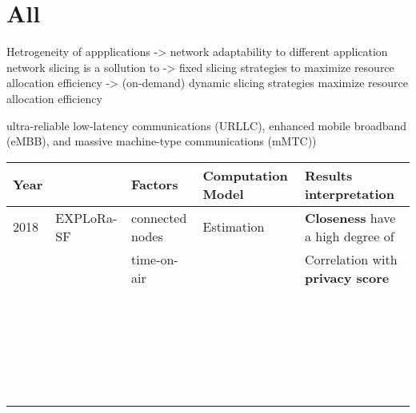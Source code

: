 \section{All}

\onecolumn
\setlength{\hoffset}{-.5in}

Hetrogeneity of appplications -> network adaptability to different application
network slicing is a sollution to 
-> fixed slicing strategies to maximize resource allocation efficiency
-> (on-demand) dynamic slicing strategies maximize resource allocation efficiency

ultra-reliable low-latency communications (URLLC), 
enhanced mobile broadband (eMBB),
and massive machine-type communications (mMTC))

\begin{longtable}{lllll}
	Year  & \                                              & \textbf{Factors}           & \textbf{Computation Model}             & \textbf{Results interpretation}                               \\\hline
	2018  & EXPLoRa-SF \cite{cuomo_explora_2017}           & connected nodes            & Estimation                             & \textbf{Closeness} have a high degree of                      \\
	\     &                                                & time-on-air                &                                        & Correlation with \textbf{privacy score}                       \\\hline
	\     &                                                &                               &                                        &                                                               \\
	\     &                                                &                               &                                        &                                                               \\
	\     &                                                &                               &                                        &                                                               \\
	\     &                                                &                               &                                        &                                                               \\
	\     &                                                &                               &                                        &                                                               \\

\end{longtable}
